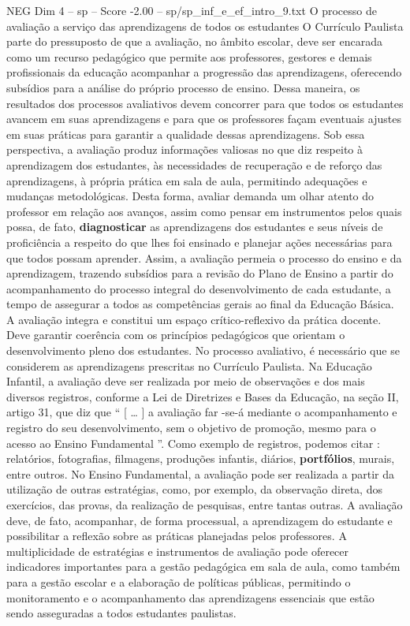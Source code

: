 \begin{textsample}{NEG Dim 4 – sp – Score -2.00 – sp/sp\_inf\_e\_ef\_intro\_9.txt}  \label{ex:f4_neg_034}
O processo de avaliação a serviço das aprendizagens de todos os estudantes O Currículo Paulista parte do pressuposto de que a avaliação, no âmbito escolar, deve ser encarada como um recurso pedagógico que permite aos professores, gestores e demais profissionais da educação acompanhar a progressão das aprendizagens, oferecendo subsídios para a análise do próprio processo de ensino.
Dessa maneira, os resultados dos processos avaliativos devem concorrer para que todos os estudantes avancem em suas aprendizagens e para que os professores façam eventuais ajustes em suas práticas para garantir a qualidade dessas aprendizagens.
Sob essa perspectiva, a avaliação produz informações valiosas no que diz respeito à aprendizagem dos estudantes, às necessidades de recuperação e de reforço das aprendizagens, à própria prática em sala de aula, permitindo adequações e mudanças metodológicas.
Desta forma, avaliar demanda um olhar atento do professor em relação aos avanços, assim como pensar em instrumentos pelos quais possa, de fato, \textbf{diagnosticar} as aprendizagens dos estudantes e seus níveis de proficiência a respeito do que lhes foi ensinado e planejar ações necessárias para que todos possam aprender.
Assim, a avaliação permeia o processo do ensino e da aprendizagem, trazendo subsídios para a revisão do Plano de Ensino a partir do acompanhamento do processo integral do desenvolvimento de cada estudante, a tempo de assegurar a todos as competências gerais ao final da Educação Básica.
A avaliação integra e constitui um espaço crítico-reflexivo da prática docente.
Deve garantir coerência com os princípios pedagógicos que orientam o desenvolvimento pleno dos estudantes.
No processo avaliativo, é necessário que se considerem as aprendizagens prescritas no Currículo Paulista.
Na Educação Infantil, a avaliação deve ser realizada por meio de observações e dos mais diversos registros, conforme a Lei de Diretrizes e Bases da Educação, na seção II, artigo 31, que diz que “ [ … ] a avaliação far -se-á mediante o acompanhamento e registro do seu desenvolvimento, sem o objetivo de promoção, mesmo para o acesso ao Ensino Fundamental ”.
Como exemplo de registros, podemos citar : relatórios, fotografias, filmagens, produções infantis, diários, \textbf{portfólios}, murais, entre outros.
No Ensino Fundamental, a avaliação pode ser realizada a partir da utilização de outras estratégias, como, por exemplo, da observação direta, dos exercícios, das provas, da realização de pesquisas, entre tantas outras.
A avaliação deve, de fato, acompanhar, de forma processual, a aprendizagem do estudante e possibilitar a reflexão sobre as práticas planejadas pelos professores.
A multiplicidade de estratégias e instrumentos de avaliação pode oferecer indicadores importantes para a gestão pedagógica em sala de aula, como também para a gestão escolar e a elaboração de políticas públicas, permitindo o monitoramento e o acompanhamento das aprendizagens essenciais que estão sendo asseguradas a todos estudantes paulistas.

\end{textsample}
